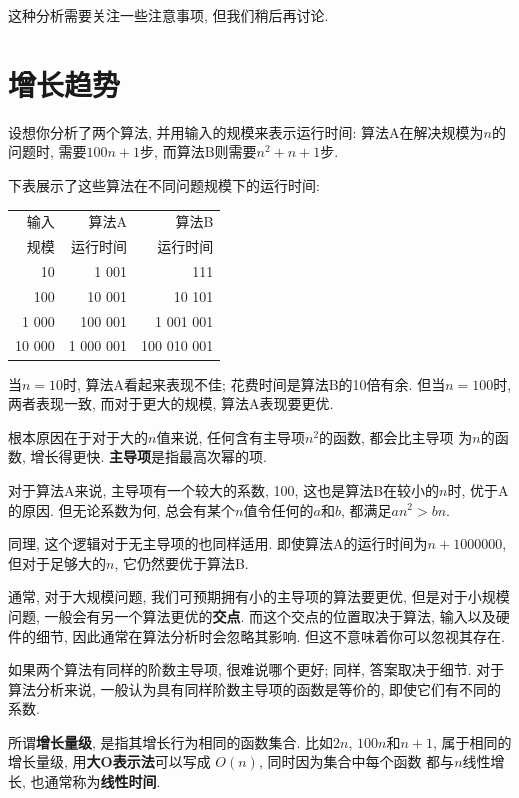 \documentclass[10pt]{book}
\begin{document}
这种分析需要关注一些注意事项, 但我们稍后再讨论. 


\section{增长趋势}

设想你分析了两个算法, 并用输入的规模来表示运行时间:
算法A在解决规模为$n$的问题时, 需要$100n+1$步, 而算法B则需要$n^2 + n + 1$步. 

下表展示了这些算法在不同问题规模下的运行时间:

\begin{tabular}{|r|r|r|}
\hline
输入     &  算法A     & 算法B \\
规模      &   运行时间     & 运行时间 \\
\hline
10        &   1 001           & 111         \\
100       &   10 001          & 10 101         \\
1 000     &   100 001         & 1 001 001         \\
10 000    &   1 000 001       & 100 010 001         \\
\hline
\end{tabular}

当$n=10$时, 算法A看起来表现不佳; 花费时间是算法B的10倍有余. 
但当$n=100$时, 两者表现一致, 而对于更大的规模, 算法A表现要更优. 

根本原因在于对于大的$n$值来说, 任何含有主导项$n^2$的函数, 都会比主导项
为$n$的函数, 增长得更快. 
{\bf 主导项}是指最高次幂的项. 

对于算法A来说, 主导项有一个较大的系数, 100, 这也是算法B在较小的$n$时, 
优于A的原因. 但无论系数为何, 
总会有某个$n$值令任何的$a$和$b$, 都满足$a n^2 > b n$. 

同理, 这个逻辑对于无主导项的也同样适用. 
即使算法A的运行时间为$n+1000000$, 但对于足够大的$n$, 它仍然要优于算法B. 

通常, 对于大规模问题, 我们可预期拥有小的主导项的算法要更优, 
但是对于小规模问题, 一般会有另一个算法更优的{\bf 交点}. 
而这个交点的位置取决于算法, 输入以及硬件的细节, 
因此通常在算法分析时会忽略其影响. 但这不意味着你可以忽视其存在. 

如果两个算法有同样的阶数主导项, 很难说哪个更好;
同样, 答案取决于细节. 
对于算法分析来说, 一般认为具有同样阶数主导项的函数是等价的, 
即使它们有不同的系数. 

所谓{\bf 增长量级}, 是指其增长行为相同的函数集合. 
比如$2n$, $100n$和$n+1$, 属于相同的增长量级, 
用{\bf 大O表示法}可以写成 $O(n)$, 同时因为集合中每个函数
都与$n$线性增长, 也通常称为{\bf 线性时间}. 
\end{document}
